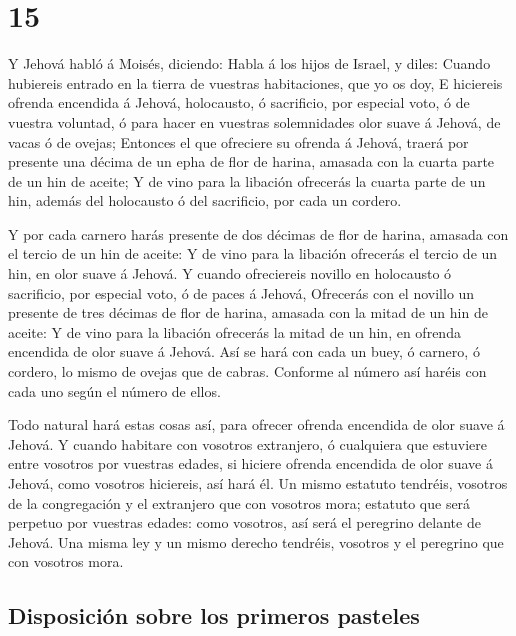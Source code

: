 \hypertarget{section-04-15}{%
\section{15}\label{section-04-15}}

 Y Jehová habló á Moisés, diciendo:  Habla á
los hijos de Israel, y diles: Cuando hubiereis entrado en la tierra de
vuestras habitaciones, que yo os doy,  E hiciereis ofrenda
encendida á Jehová, holocausto, ó sacrificio, por especial voto, ó de
vuestra voluntad, ó para hacer en vuestras solemnidades olor suave á
Jehová, de vacas ó de ovejas;  Entonces el que ofreciere
su ofrenda á Jehová, traerá por presente una décima de un epha de flor
de harina, amasada con la cuarta parte de un hin de aceite;
 Y de vino para la libación ofrecerás la cuarta parte de
un hin, además del holocausto ó del sacrificio, por cada un cordero.

 Y por cada carnero harás presente de dos décimas de flor
de harina, amasada con el tercio de un hin de aceite:  Y
de vino para la libación ofrecerás el tercio de un hin, en olor suave á
Jehová.  Y cuando ofreciereis novillo en holocausto ó
sacrificio, por especial voto, ó de paces á Jehová, 
Ofrecerás con el novillo un presente de tres décimas de flor de harina,
amasada con la mitad de un hin de aceite:  Y de vino para
la libación ofrecerás la mitad de un hin, en ofrenda encendida de olor
suave á Jehová.  Así se hará con cada un buey, ó carnero,
ó cordero, lo mismo de ovejas que de cabras.  Conforme al
número así haréis con cada uno según el número de ellos.

 Todo natural hará estas cosas así, para ofrecer ofrenda
encendida de olor suave á Jehová.  Y cuando habitare con
vosotros extranjero, ó cualquiera que estuviere entre vosotros por
vuestras edades, si hiciere ofrenda encendida de olor suave á Jehová,
como vosotros hiciereis, así hará él.  Un mismo estatuto
tendréis, vosotros de la congregación y el extranjero que con vosotros
mora; estatuto que será perpetuo por vuestras edades: como vosotros, así
será el peregrino delante de Jehová.  Una misma ley y un
mismo derecho tendréis, vosotros y el peregrino que con vosotros mora.

\hypertarget{disposiciuxf3n-sobre-los-primeros-pasteles}{%
\subsection{Disposición sobre los primeros
pasteles}\label{disposiciuxf3n-sobre-los-primeros-pasteles}}

